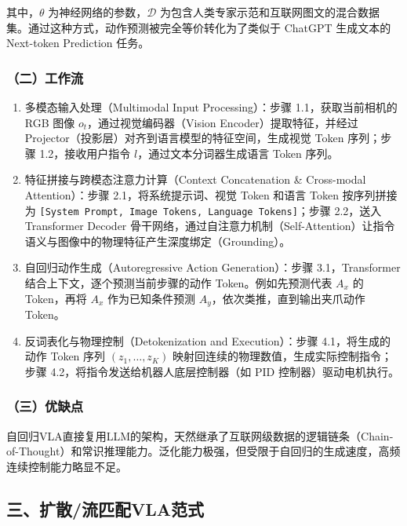 其中，\(\theta\) 为神经网络的参数，\(\mathcal{D}\) 为包含人类专家示范和互联网图文的混合数据集。通过这种方式，动作预测被完全等价转化为了类似于 ChatGPT 生成文本的 Next-token Prediction 任务。

\hypertarget{ux4e8cux5de5ux4f5cux6d41-6}{%
\subsubsection{（二）工作流}\label{ux4e8cux5de5ux4f5cux6d41-6}}

\begin{enumerate}
\def\labelenumi{\arabic{enumi}.}
\item
  多模态输入处理（Multimodal Input Processing）：步骤 1.1，获取当前相机的 RGB 图像 \(o_t\)，通过视觉编码器（Vision Encoder）提取特征，并经过 Projector（投影层）对齐到语言模型的特征空间，生成视觉 Token 序列；步骤 1.2，接收用户指令 \(l\)，通过文本分词器生成语言 Token 序列。
\item
  特征拼接与跨模态注意力计算（Context Concatenation \& Cross-modal Attention）：步骤 2.1，将系统提示词、视觉 Token 和语言 Token 按序列拼接为 \texttt{{[}System\ Prompt,\ Image\ Tokens,\ Language\ Tokens{]}}；步骤 2.2，送入 Transformer Decoder 骨干网络，通过自注意力机制（Self-Attention）让指令语义与图像中的物理特征产生深度绑定（Grounding）。
\item
  自回归动作生成（Autoregressive Action Generation）：步骤 3.1，Transformer 结合上下文，逐个预测当前步骤的动作 Token。例如先预测代表 \(A_x\) 的 Token，再将 \(A_x\) 作为已知条件预测 \(A_y\)，依次类推，直到输出夹爪动作 Token。
\item
  反词表化与物理控制（Detokenization and Execution）：步骤 4.1，将生成的动作 Token 序列 \((z_1,\ldots,z_K)\) 映射回连续的物理数值，生成实际控制指令；步骤 4.2，将指令发送给机器人底层控制器（如 PID 控制器）驱动电机执行。
\end{enumerate}

\hypertarget{ux4e09ux4f18ux7f3aux70b9}{%
\subsubsection{（三）优缺点}\label{ux4e09ux4f18ux7f3aux70b9}}

自回归VLA直接复用LLM的架构，天然继承了互联网级数据的逻辑链条（Chain-of-Thought）和常识推理能力。泛化能力极强，但受限于自回归的生成速度，高频连续控制能力略显不足。

\hypertarget{ux4e09ux6269ux6563ux6d41ux5339ux914dvlaux8303ux5f0f}{%
\subsection{三、扩散/流匹配VLA范式}\label{ux4e09ux6269ux6563ux6d41ux5339ux914dvlaux8303ux5f0f}}

